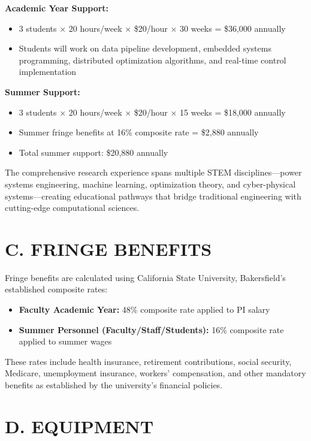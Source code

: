 \documentclass[12pt]{article}
\begin{document}
\textbf{Academic Year Support:}
\begin{itemize}
    \item 3 students × 20 hours/week × \$20/hour × 30 weeks = \$36,000 annually
    \item Students will work on data pipeline development, embedded systems programming, distributed optimization algorithms, and real-time control implementation
\end{itemize}

\textbf{Summer Support:}
\begin{itemize}
    \item 3 students × 20 hours/week × \$20/hour × 15 weeks = \$18,000 annually
    \item Summer fringe benefits at 16\% composite rate = \$2,880 annually
    \item Total summer support: \$20,880 annually
\end{itemize}

The comprehensive research experience spans multiple STEM disciplines---power systems engineering, machine learning, optimization theory, and cyber-physical systems---creating educational pathways that bridge traditional engineering with cutting-edge computational sciences.

\section{C. FRINGE BENEFITS}

Fringe benefits are calculated using California State University, Bakersfield's established composite rates:

\begin{itemize}
    \item \textbf{Faculty Academic Year:} 48\% composite rate applied to PI salary
    \item \textbf{Summer Personnel (Faculty/Staff/Students):} 16\% composite rate applied to summer wages
\end{itemize}

These rates include health insurance, retirement contributions, social security, Medicare, unemployment insurance, workers' compensation, and other mandatory benefits as established by the university's financial policies.

\section{D. EQUIPMENT}
\end{document}
